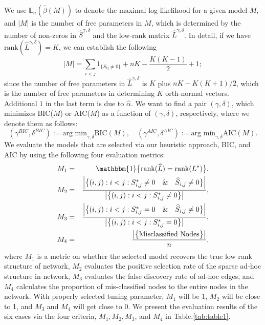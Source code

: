 \documentclass[AMS,STIX1COL]{WileyNJD-v2}
\begin{document}
{We use $\mathbb{L}_n( \hat{\beta}(M))$ to denote the maximal log-likelihood for a given model $M$,
and $|M|$ is the number of free parameters in $M$, which is determined by the number of non-zeros in $\widehat{S}^{\gamma,\delta}$ and the low-rank matrix $\widehat{L}^{\gamma,\delta}$.
In detail, if we have $\text{rank}(\widehat{L}^{\gamma,\delta})=K$, we can establish the following
\[
|M| = \sum_{i < j}1_{\{S_{ij} \neq 0\}} + n K - \frac{K(K-1)}{2} + 1 ;
\]
since the number of free parameters in $\widehat{L}^{\gamma,\delta}$ is $K$ plus $nK - K(K+1)/2$, which is the number of free parameters in determining $K$ orth-normal vectors.
Additional $1$ in the last term is due to $\hat{\alpha}$.
We want to find a pair $(\gamma,\delta)$, which minimizes BIC($M$) or AIC($M$) as a function of $(\gamma,\delta)$, respectively, where we denote them as follows:
\[
    (\gamma^{BIC},\delta^{BIC}):= \mbox{arg min}_{\gamma, \delta}
    \mbox{BIC}(M),
    \quad
    (\gamma^{AIC},\delta^{AIC}):= \mbox{arg min}_{\gamma, \delta}
    \mbox{AIC}(M).
\]
We evaluate the models that are selected via our heuristic approach, BIC, and AIC by using the following four evaluation metrics:
\begin{eqnarray*}
M_1 &=& \mathbbm{1}\big\{\mbox{rank}(\widehat{L}) = \mbox{rank}(L^{*})\big\}, \\
M_2 &=& \frac{\left|\big\{(i,j):i<j:S^{*}_{i,j} \neq0 \quad \& \quad \widehat{S}_{i,j} \neq 0 \big\}\right|}{\left|\big\{(i,j):i<j:S^{*}_{i,j}\neq0\big\}\right|}, \\
M_3 &=& \frac{\left|\big\{(i,j):i<j:S^{*}_{i,j} = 0 \quad \& \quad \widehat{S}_{i,j} \neq 0 \big\}\right|}{\left|\big\{(i,j):i<j:S^{*}_{i,j}=0\big\}\right|}, \\
M_4 &=& \frac{\left|\big\{\mbox{Misclassified Nodes}\big\}\right|}{n},
\end{eqnarray*}
where $M_1$ is a metric on whether the selected model recovers the true low rank structure of network,
$M_2$ evaluates the positive selection rate of the sparse ad-hoc structure in network,
$M_3$ evaluates the false discovery rate of ad-hoc edges, and
$M_4$ calculates the proportion of mis-classified nodes to the entire nodes in the network.
With properly selected tuning parameter, $M_1$ will be 1, $M_2$ will be close to 1, and $M_3$ and $M_4$ will get close to 0.
We present the evaluation results of the six cases via the four criteria, $M_1,M_2,M_3$, and $M_4$ in Table.\ref{tab:table1}.

}
\end{document}
